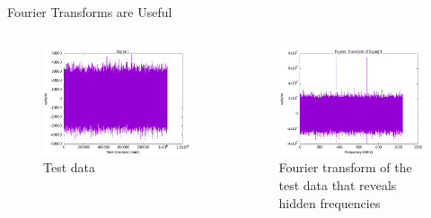\documentclass[10pt, aspectratio=168]{beamer}
\begin{document}
    \begin{frame}{Fourier Transforms are Useful}
    \begin{columns}
     \begin{column}{0.4\textwidth}    
    \begin{figure}[h]
    \centering
    \includegraphics[width=1\textwidth]{test_08.png}
    \caption{Test data}
    \label{fig:test-08}
\end{figure}
\end{column}
         \begin{column}{0.4\textwidth}    
    \begin{figure}[h]
    \centering
    \includegraphics[width=1\textwidth]{fft_test_08.png}
    \caption{Fourier transform of the test data that reveals hidden frequencies}
    \label{fig:fft-test-08}
\end{figure}
\end{column}
    \end{columns}
        
    \end{frame}
    
\end{document}
